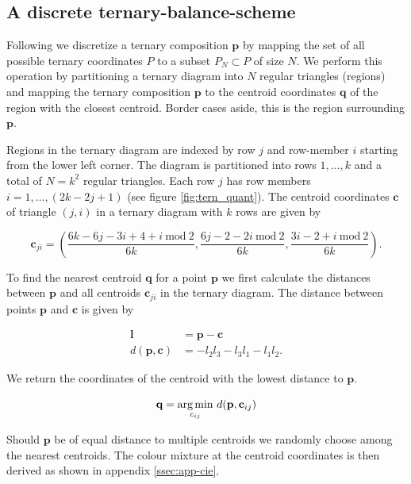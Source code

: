 \documentclass[parskip=half]{scrartcl}
\begin{document}
\begin{appendix}
\clearpage

\subsection{A discrete ternary-balance-scheme} %
\label{ssec:disc}

Following \textcite{Derakhshan2009} we discretize a ternary composition $\textbf{p}$ by mapping the set of all possible ternary coordinates $P$ to a subset $P_N \subset P$ of size $N$. We perform this operation by partitioning a ternary diagram into $N$ regular triangles (regions) and mapping the ternary composition $\textbf{p}$ to the centroid coordinates $\textbf{q}$ of the region with the closest centroid. Border cases aside, this is the region surrounding $\textbf{p}$.

Regions in the ternary diagram are indexed by row $j$ and row-member $i$ starting from the lower left corner. The diagram is partitioned into rows $1,\ldots,k$ and a total of $N = k^2$ regular triangles. Each row $j$ has row members $i = 1, \ldots, (2k-2j+1)$ (see figure \ref{fig:tern_quant}). The centroid coordinates $\textbf{c}$ of triangle $(j,i)$ in a ternary diagram with $k$ rows are given by

\begin{equation*}
  \textbf{c}_{ji} = \left(\frac{6k - 6j - 3i + 4 + i~\text{mod}~2} {6k},
  \frac{6j - 2 - 2 i~\text{mod}~2} {6k},
  \frac{3i - 2 + i~\text{mod}~2} {6k} \right).
\end{equation*}

To find the nearest centroid $\textbf{q}$ for a point $\textbf{p}$ we first calculate the distances between $\textbf{p}$ and all centroids $\textbf{c}_{ji}$ in the ternary diagram. The distance between points $\textbf{p}$ and $\textbf{c}$ is given by

$$
\begin{aligned}
  \textbf{l} &= \textbf{p} - \textbf{c} \\
  d(\textbf{p}, \textbf{c}) &= - l_2l_3 - l_3l_1 - l_1l_2.
\end{aligned}
$$

We return the coordinates of the centroid with the lowest distance to $\textbf{p}$.

\begin{equation*}
\textbf{q} = \underset{c_{ij}}{\text{arg\,min}}~d(\textbf{p}, \textbf{c}_{ij})
\end{equation*}

Should $\textbf{p}$ be of equal distance to multiple centroids we randomly choose among the nearest centroids. The colour mixture at the centroid coordinates is then derived as shown in appendix \ref{ssec:app-cie}.


\end{appendix}
\end{document}
